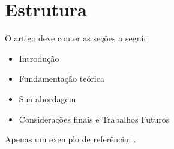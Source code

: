 \section{Estrutura}
\label{sec:intro}

O artigo deve conter as seções a seguir:

\begin{itemize}
    \item Introdução
    \item Fundamentação teórica
    \item Sua abordagem
    \item Considerações finais e Trabalhos Futuros
\end{itemize}

Apenas um exemplo de referência: \cite{aurelio}.